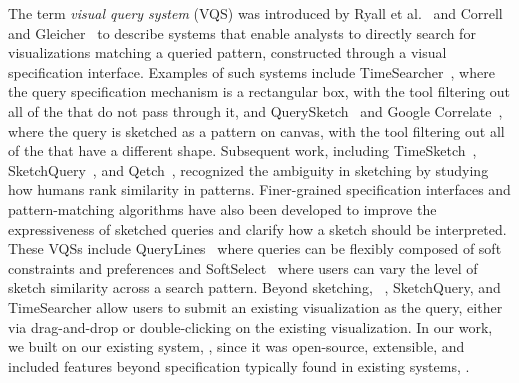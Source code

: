   \npar The term \emph{visual query system} (VQS) was introduced by Ryall et al.~\cite{ryall2005querylines} and Correll and Gleicher~\cite{correll2016semantics} to describe systems that enable analysts to directly search for  visualizations matching a queried pattern, constructed through a visual specification interface. Examples of such systems include TimeSearcher~\cite{Hochheiser2001,Hochheiser2004}, where the query specification mechanism is a rectangular box, with the tool filtering out all of the  that do not pass through it, and QuerySketch~\cite{wattenberg2001sketching} and Google Correlate~\cite{mohebbi2011google}, where the query is sketched as a pattern on canvas, with the tool filtering out all of the  that have a different shape. Subsequent work, including TimeSketch~\cite{Eichmann2015}, SketchQuery~\cite{correll2016semantics}, and Qetch~\cite{Mannino2018}, recognized the ambiguity in sketching by studying how humans rank similarity in patterns. Finer-grained specification interfaces and pattern-matching algorithms have also been developed to improve the expressiveness of sketched queries and clarify how a sketch should be interpreted. These VQSs include QueryLines~\cite{ryall2005querylines} where queries can be flexibly composed of soft constraints and preferences and SoftSelect~\cite{Holz2009} where users can vary the level of sketch similarity across a search pattern. Beyond sketching, \zv~\cite{Siddiqui2017,Siddiqui2017VLDB}, SketchQuery, and TimeSearcher allow users to submit an existing visualization as the query, either via drag-and-drop or double-clicking on the existing visualization. In our work, we built on our existing system, \zv, since it was open-source, extensible, and included features beyond  specification typically found in existing systems, . %
